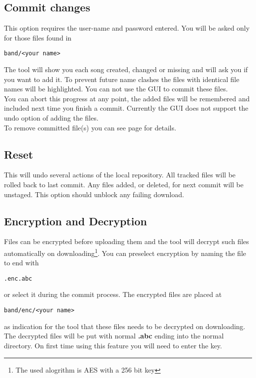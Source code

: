 \documentclass[10pt,a4paper,oneside]{article}
\begin{document}
\subsection{Commit changes}
This option requires the user-name and password entered. You will be asked only for those files found in\begin{verbatim}
band/<your name>
\end{verbatim} The tool will show you each song created, changed or missing and will ask you if you want to add it. To prevent future name clashes the files with identical file names will be highlighted. You can not use the GUI to commit these files. \\
You can abort this progress at any point, the added files will be remembered and included next time you finish a commit. Currently the GUI does not support the undo option of adding the files. \\
To remove committed file(s) you can see page \pageref{Undo commit} for details.

\subsection{Reset}
\label{Reset}
This will undo several actions of the local repository. All tracked files will be rolled back to last commit. Any files added, or deleted, for next commit will be unstaged. This option should unblock any failing download.

\subsection{Encryption and Decryption}
\label{AES}
Files can be encrypted before uploading them and the tool will decrypt such files automatically on downloading\footnote{The used alogrithm is AES with a 256 bit key}. You can preselect encryption by naming the file to end with \begin{verbatim}
.enc.abc
\end{verbatim} or select it during the commit process. The encrypted files are placed at \begin{verbatim}
band/enc/<your name>
\end{verbatim} as indication for the tool that these files needs to be decrypted on downloading. The decrypted files will be put with normal \textbf{.abc} ending into the normal directory. On first time using this feature you will need to enter the key.
\end{document}
